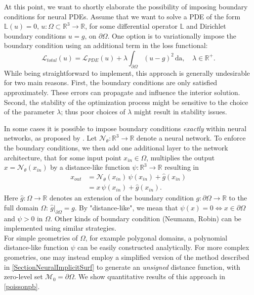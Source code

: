 \documentclass[12pt,openany]{book}
\newcommand{\R}{\mathbb{R}}
\theoremstyle{plainnormal}
\theoremstyle{remark}
\begin{document}
At this point, we want to shortly elaborate the possibility of imposing boundary conditions for neural PDEs. Assume that we want to solve a PDE of the form $\mathbb{L}(u) = 0, \, u:\Omega\subset\R^3\rightarrow\R$, for some differential operator $\mathbb{L}$ and Dirichlet boundary conditions $ u = g \text{, on }\partial\Omega$. One option is to variationally impose the boundary condition using an additional term in the loss functional: $$\mathcal L_{total}(u) = \mathcal{L}_{PDE}(u) + \lambda \int_{\partial \Omega} (u - g) ^2\, \mathrm{da}, \quad \lambda \in\R^+.$$
While being straightforward to implement, this approach is generally undesirable for two main reasons. First, the boundary conditions are only satisfied approximately. These errors can propagate and influence the interior solution.  Second, the stability of the optimization process might be sensitive to the choice of the parameter $\lambda$; thus poor choices of $\lambda$ might result in stability issues.\par
In some cases it is possible to impose boundary conditions \emph{exactly} within neural networks, as proposed by \cite{BERRONE2023e18820}. Let $\mathcal{N}_\theta: \R^3 \rightarrow \R$ denote a neural network. To enforce the boundary conditions, we then add one additional layer to the network architecture, that for some input point $x_{in} \in \Omega$, multiplies the output $x= \mathcal N _\theta(x_{in})$  by a distance-like function $\psi: \R^3 \rightarrow\R$ resulting in 
\begin{align*}
    x_{out} &= \mathcal N_\theta(x_{in})\,\psi(x_{in}) + \hat g(x_{in}) \\&= x\,\psi(x_{in})+ \hat g(x_{in}).
\end{align*}
Here $\hat{g}: \Omega \rightarrow\R$ denotes an extension of the boundary condition $g: \partial \Omega \rightarrow \R $ to the full domain $\Omega$: $\hat g|_{\partial \Omega} = g$. By "distance-like", we mean that $\psi(x) = 0 \Leftrightarrow x \in \partial  \Omega$ and $\psi > 0$ in $\Omega$. Other kinds of boundary condition (Neumann, Robin) can be implemented using similar strategies. \\
For simple geometries of $\Omega$, for example polygonal domains, a polynomial distance-like function $\psi$ can be easily constructed analytically. For more complex geometries, one may instead employ a simplified version of the method described in \cref{SectionNeuralImplicitSurf} to generate an \emph{unsigned} distance function, with zero-level set $\mathcal M_0 = \partial \Omega$. We show quantitative results of this approach in \cref{poissonpb}.
\end{document}
